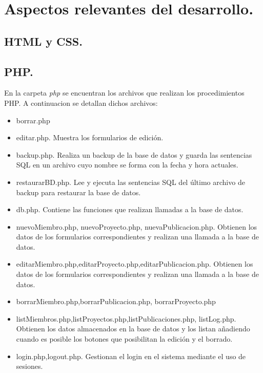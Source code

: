 \documentclass[a4paper, 11pt]{article} %
\begin{document}
\section{Aspectos relevantes del desarrollo.}
\subsection{HTML y CSS.}
\subsection{PHP.}
En la carpeta \emph{\/php} se encuentran los archivos que realizan los procedimientos PHP. A continuacion se detallan dichos archivos:
\begin{itemize}
	\item borrar.php
	\item editar.php. Muestra los formularios de edición.
	\item backup.php. Realiza un backup de la base de datos y guarda las sentencias SQL en un archivo cuyo nombre se forma con la fecha y hora actuales. 
	\item restaurarBD.php. Lee y ejecuta las sentencias SQL del último archivo de backup para restaurar la base de datos. 
	\item db.php. Contiene las funciones que realizan llamadas a la base de datos.
	\item nuevoMiembro.php, nuevoProyecto.php, nuevaPublicacion.php. Obtienen los datos de los formularios correspondientes y realizan una llamada a la base de datos.
	\item editarMiembro.php,editarProyecto.php,editarPublicacion.php. Obtienen los datos de los formularios correspondientes y realizan una llamada a la base de datos.
	\item borrarMiembro.php,borrarPublicacion.php, borrarProyecto.php
    \item listMiembros.php,listProyectos.php,listPublicaciones.php, listLog.php. Obtienen los datos almacenados en la base de datos y los listan añadiendo cuando es posible los botones que posibilitan la edición y el borrado.
    \item login.php,logout.php. Gestionan el login en el sistema mediante el uso de sesiones.
	
\end{itemize}
\end{document}
